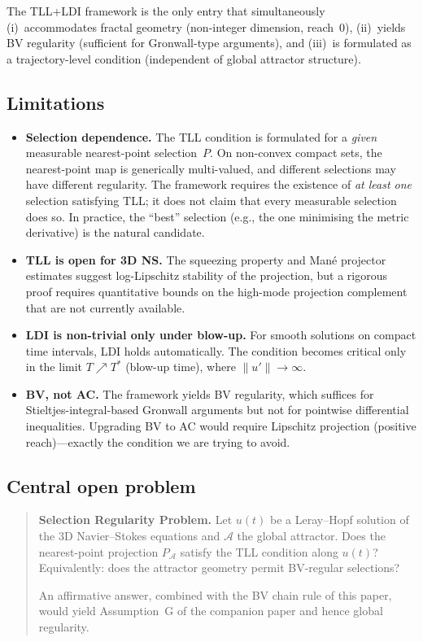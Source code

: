 \documentclass[12pt,a4paper]{article}
\theoremstyle{definition}
\theoremstyle{plain}
\theoremstyle{remark}
\begin{document}
\noindent
The TLL+LDI framework is the only entry that simultaneously
(i)~accommodates fractal geometry (non-integer dimension, reach~$0$),
(ii)~yields BV regularity (sufficient for Gronwall-type arguments),
and (iii)~is formulated as a trajectory-level condition
(independent of global attractor structure).

\subsection{Limitations}

\begin{itemize}
  \item \textbf{Selection dependence.}\;
    The TLL condition is formulated for a \emph{given} measurable
    nearest-point selection~$P$.  On non-convex compact sets, the
    nearest-point map is generically multi-valued, and different
    selections may have different regularity.  The framework requires
    the existence of \emph{at least one} selection satisfying TLL;
    it does not claim that every measurable selection does so.  In
    practice, the ``best'' selection (e.g., the one minimising the
    metric derivative) is the natural candidate.
  \item \textbf{TLL is open for 3D NS.}\;
    The squeezing property and Man\'e projector estimates suggest
    log-Lipschitz stability of the projection, but a rigorous proof
    requires quantitative bounds on the high-mode projection
    complement that are not currently available.
  \item \textbf{LDI is non-trivial only under blow-up.}\;
    For smooth solutions on compact time intervals, LDI holds
    automatically.  The condition becomes critical only in the
    limit $T \nearrow T^*$ (blow-up time), where $\|u'\| \to \infty$.
  \item \textbf{BV, not AC.}\;
    The framework yields BV regularity, which suffices for
    Stieltjes-integral-based Gronwall arguments but not for
    pointwise differential inequalities.  Upgrading BV to AC
    would require Lipschitz projection (positive reach)---exactly
    the condition we are trying to avoid.
\end{itemize}


\subsection*{Central open problem}
\begin{quote}
\textbf{Selection Regularity Problem.}
Let $u(t)$ be a Leray--Hopf solution of the 3D Navier--Stokes equations and $\mathcal{A}$ the global attractor. Does the nearest-point projection $P_\mathcal{A}$ satisfy the TLL condition along $u(t)$? Equivalently: does the attractor geometry permit BV-regular selections?

An affirmative answer, combined with the BV chain rule of this paper, would yield Assumption~G of the companion paper \cite{FST-NS2026} and hence global regularity.
\end{quote}
\end{document}

